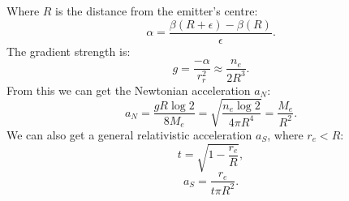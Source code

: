 \documentclass[12pt]{article}
\begin{document}
Where $R$ is the distance from the emitter's centre:
\begin{equation}
\alpha = \frac{\beta(R + \epsilon) - \beta(R)}{\epsilon}.
\end{equation}
The gradient strength is:
\begin{equation}
g = \frac{-\alpha}{r_{r}^2} \approx \frac{n_e}{2 R^3}.
\end{equation}
From this we can get the Newtonian acceleration $a_N$:
\begin{equation}
a_N =\frac{g R \log 2}{8 M_{e}} =  \sqrt{\frac{n_e \log 2}{4 \pi R^4}} = \frac{M_{e}}{R^2}.
\end{equation}
We can also get a general relativistic acceleration $a_S$, where $r_e < R$:
\begin{equation}
t = \sqrt{1 - \frac{r_e}{R}},
\end{equation}
\begin{equation}
a_S = \frac{r_e}{t \pi R^2}.
\end{equation}
\end{document}
